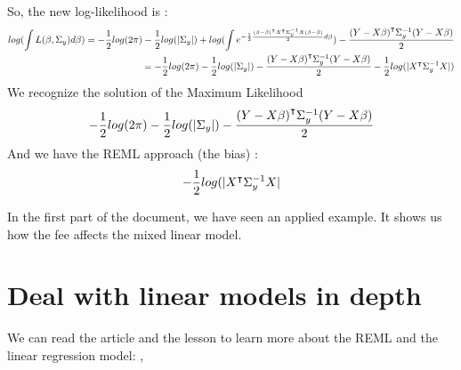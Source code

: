 \documentclass{article}
\begin{document}
\begin{exemple}
\begin{exemple}
So, the new log-likelihood is :
\begin{equation*}
    \begin{split}
       log(\int L(\beta, \Sigma_y)d\beta) = -\frac{1}{2}log(2\pi)-\frac{1}{2}log(|\Sigma_y|)+log(\int e^{-\frac{1}{2}\frac{{(\beta-\hat{\beta})}^\intercal {X}^\intercal \Sigma_y^{-1}X (\beta-\hat{\beta})}{2} d\beta}) -\frac{{(Y-X\beta)}^\intercal\Sigma_y^{-1}(Y-X\beta)}{2}\\
       =-\frac{1}{2}log(2\pi)-\frac{1}{2}log(|\Sigma_y|)-\frac{{(Y-X\beta)}^\intercal\Sigma_y^{-1}(Y-X\beta)}{2} - \frac{1}{2}log(|{X}^\intercal\Sigma_y^{-1}X|)  
    \end{split}
\end{equation*}
We recognize the solution of the Maximum Likelihood
\[-\frac{1}{2}log(2\pi)-\frac{1}{2}log(|\Sigma_y|)-\frac{{(Y-X\beta)}^\intercal\Sigma_y^{-1}(Y-X\beta)}{2}\]
And we have the REML approach (the bias) : \[- \frac{1}{2}log(|{X}^\intercal \Sigma_y^{-1}X|\]
\end{exemple}
In the first part of the document, we have seen an applied example. It shows us how the fee affects the mixed linear model.
\end{exemple}


\section{Deal with linear models in depth}
\label{sec:pour_aller_plus_loin_sur_ce_theme}
We can read the article and the lesson to learn more about the REML and the linear regression model:
\cite{Google}, \cite{Teaching}



\end{document}
